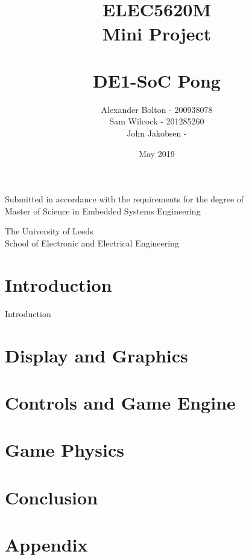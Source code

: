 \documentclass[a4paper,12pt]{article}
\begin{document}
\title{\\ \textbf{ELEC5620M \\ Mini Project \\ \- \\ DE1-SoC Pong }}
\author{Alexander Bolton - 200938078 \\ Sam Wilcock - 201285260\\ John Jakobsen - }
\date{May 2019}
\maketitle
\begin{center}
Submitted in accordance with the requirements for the degree of \\
Master of Science in Embedded Systems Engineering
\end{center}
\vfill
\begin{center}
The University of Leeds \\  School of Electronic and Electrical Engineering
\end{center}
\newpage

\tableofcontents
\newpage 
\section{Introduction}
\begin{flushleft}
Introduction
\end{flushleft}
\newpage
\section{Display and Graphics}
\newpage
\section{Controls and Game Engine}
\newpage
\section{Game Physics}
\newpage
\section{Conclusion}
\begin{flushleft}

\end{flushleft}
\newpage
\section{Appendix}
\newpage
{}
\begin{flushleft}

\end{flushleft}
\end{document}
